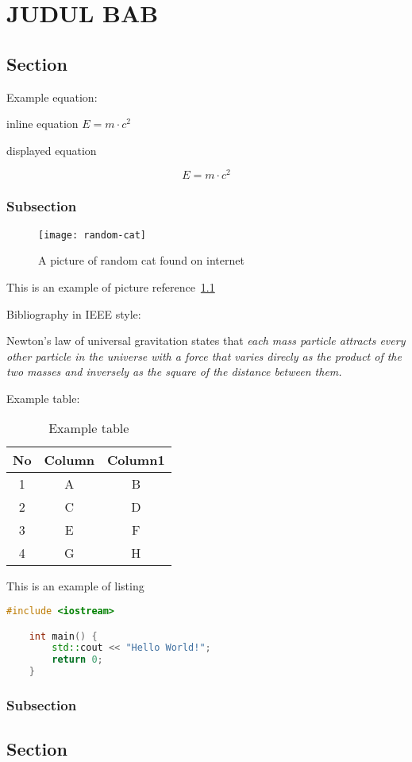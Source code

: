 \chapter{JUDUL BAB}
\section{Section}
\lipsum[1]
Example equation:

inline equation $E=m\cdot c^2$

displayed equation

\begin{equation}
    E=m\cdot c^2
\end{equation}

\subsection{Subsection}

\begin{figure}[H]
    \centering
    \texttt{[image: random-cat]}
    \caption{A picture of random cat found on internet}\label{random-cat}
\end{figure}

This is an example of picture reference~\cref{random-cat}

Bibliography in IEEE style:

Newton's law of universal gravitation states that \textit{each mass particle attracts every other particle in the universe with a force that varies direcly as the product of the two masses and inversely as the square of the distance between them.}~\autocite{book:classical}

Example table:

\begin{table}[H]
    \centering
    \caption{Example table}\label{table1}
    \begin{tabular}{ccc}
        \toprule
        No & Column & Column1 \\
        \midrule
        1  & A      & B       \\
        2  & C      & D       \\
        3  & E      & F       \\
        4  & G      & H       \\
        \bottomrule
    \end{tabular}
\end{table}

This is an example of listing
\begin{lstlisting}[language=c++, caption={C++ Hello World!}, style=box]
    #include <iostream>

    int main() {
        std::cout << "Hello World!";
        return 0;
    }
\end{lstlisting}

\lipsum[1]
\subsection{Subsection}
\lipsum[1]
\section{Section}
\lipsum[2]
